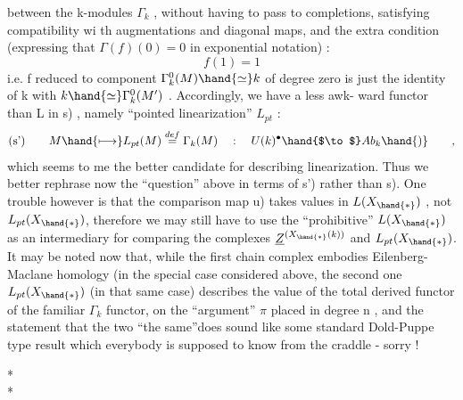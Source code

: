 
between the k-modules $\Gamma_k$ ,  without having to pass to completions,
satisfying compatibility wi th augmentations and diagonal maps,  and
the extra condition  (expressing that $\Gamma(f)(0) = 0$ \xout{)} in exponential
notation) :
\[ f(1) = 1 \]
i.e. f reduced to component  $\Gamma_k^{0}(M)\hand{\simeq} k$  of degree zero is just
the identity of k with  $k\hand{\simeq}\Gamma_k^{0}(M')$ .  Accordingly,  we have a less awk-%
ward  functor than L in \hand{(}s) ,  namely ``pointed linearization'' $L_{pt}$ :
\[ \text{(s')} \qquad M\hand{\longmapsto} L_{pt}(M)\overset{def}{=}\Gamma_k(M) \quad : \quad U(k)^{\bullet}\hand{$\to$} Ab_k \hand{)} \qquad , \]
 which seems to me the better candidate for describing linearization.
Thus we better rephrase now the ``question'' above in terms of \hand{(}s') rather
than \hand{(}s).  One trouble however is that the comparison map \hand{(}u)  takes 
values in $L(X_{\hand{*}})$ ,  not $L_{pt}(X_{\hand{*}})$,  therefore we may still have to use
the ``prohibitive'' $L(X_{\hand{*}})$  as an intermediary for comparing  the complexes
$\underline{Z}^{(X_{\hand{*}}(k))}$  and $L_{pt}(X_{\hand{*}})$.  It may be noted now that,  while the first chain
 complex embodies  Eilenberg-Maclane homology   (in the special case
considered above\hand{)}, the second one  $L_{pt}(X_{\hand{*}})$  (in that same case) describes
the value of the total derived functor of the familiar $\Gamma_k$ functor,  on
the ``argument'' $\pi$ placed in degree n ,  and the statement that the two
``the same''does sound like some standard Dold-Puppe type result
which everybody is supposed to know from the craddle  - sorry !

\begin{center}
* \qquad *\\
*
\end{center}


